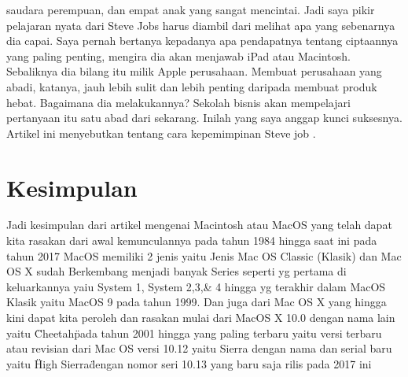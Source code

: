 saudara perempuan, dan empat anak yang sangat mencintai. Jadi saya pikir pelajaran nyata dari Steve Jobs harus diambil dari melihat apa yang sebenarnya dia capai. Saya pernah bertanya 
kepadanya apa pendapatnya tentang ciptaannya yang paling penting, mengira dia akan menjawab iPad atau Macintosh. Sebaliknya dia bilang itu milik Apple perusahaan. Membuat perusahaan 
yang abadi, katanya, jauh lebih sulit dan lebih penting daripada membuat produk hebat. Bagaimana dia melakukannya? Sekolah bisnis akan mempelajari pertanyaan itu satu abad dari sekarang. 
Inilah yang saya anggap kunci suksesnya.
Artikel ini menyebutkan tentang cara kepemimpinan Steve job \cite{isaacson2012real}.

\section{Kesimpulan}
Jadi kesimpulan dari artikel mengenai Macintosh atau MacOS yang telah dapat kita rasakan dari awal kemunculannya pada tahun 1984 hingga saat ini pada tahun 2017 MacOS memiliki 2 jenis yaitu Jenis Mac OS Classic (Klasik) dan Mac OS X sudah Berkembang menjadi banyak Series seperti yg pertama di keluarkannya yaiu System 1, System 2,3,\& 4 hingga yg terakhir dalam MacOS Klasik yaitu MacOS 9 pada tahun 1999. Dan juga dari Mac OS X yang hingga kini dapat kita peroleh dan rasakan mulai dari MacOS X 10.0 dengan nama lain yaitu \"Cheetah\" pada tahun 2001 hingga yang paling terbaru yaitu versi terbaru atau revisian dari Mac OS versi 10.12 yaitu Sierra dengan nama dan serial baru yaitu \"High Sierra\" dengan nomor seri 10.13 yang baru saja rilis pada 2017 ini